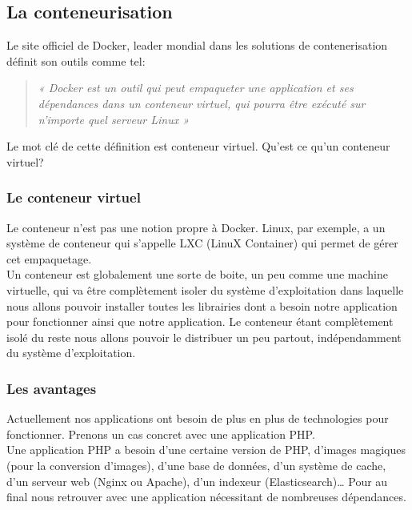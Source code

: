     \subsection{La conteneurisation}
    Le site officiel de Docker, leader mondial dans les solutions de contenerisation définit son outils comme tel:\\

    \begin{quotation}
      \emph{« Docker est un outil qui peut empaqueter une application et ses dépendances dans un conteneur virtuel, qui pourra être exécuté sur n’importe quel serveur Linux »}\\
    \end{quotation}

    Le mot clé de cette définition est conteneur virtuel. Qu’est ce qu’un conteneur virtuel?

      \subsubsection{Le conteneur virtuel}
      Le conteneur n’est pas une notion propre à Docker. Linux, par exemple, a un système de conteneur qui s’appelle LXC (LinuX Container) qui permet de gérer cet empaquetage.\\

      Un conteneur est globalement une sorte de boite, un peu comme une machine virtuelle, qui va être complètement isoler du système d’exploitation dans laquelle nous allons pouvoir installer toutes les librairies dont a besoin notre application pour fonctionner ainsi que notre application. Le conteneur étant complètement isolé du reste nous allons pouvoir le distribuer un peu partout, indépendamment du système d’exploitation.

      \subsubsection{Les avantages}
      Actuellement nos applications ont besoin de plus en plus de technologies pour fonctionner. Prenons un cas concret avec une application PHP.\\

      Une application PHP a besoin d’une certaine version de PHP, d’images magiques (pour la conversion d’images), d’une base de données, d’un système de cache, d’un serveur web (Nginx ou Apache), d’un indexeur (Elasticsearch)… Pour au final nous retrouver avec une application nécessitant de nombreuses dépendances.\\

